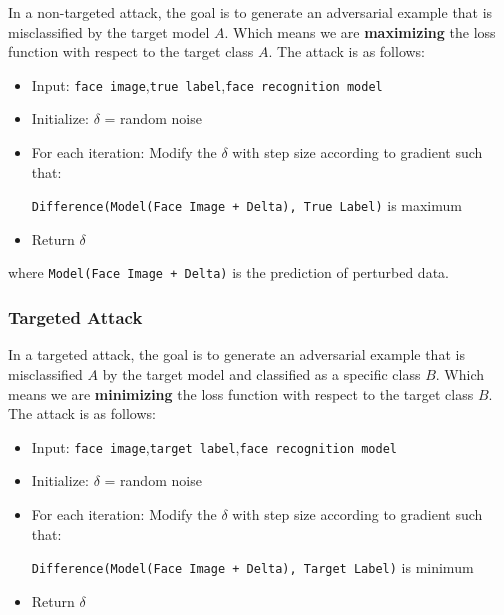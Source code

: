 In a non-targeted attack, the goal is to generate an adversarial example that is misclassified by the target model $A$. Which means we are \textbf{maximizing} the loss function with respect to the target class $A$. The attack is as follows:\\

\begin{itemize}
    \item Input: \verb|face image|,\quad \verb|true label|,\quad \verb|face recognition model|
    \item Initialize: $\delta$ = random noise
    \item For each iteration: Modify the $\delta$ with step size according to gradient such that:\begin{center}
        \verb|Difference(Model(Face Image + Delta), True Label)| is maximum
    \end{center}

    \item Return $\delta$\\
\end{itemize}

where \verb|Model(Face Image + Delta)| is the prediction of perturbed data.

\subsubsection{Targeted Attack}

In a targeted attack, the goal is to generate an adversarial example that is misclassified $A$ by the target model and classified as a specific class $B$. Which means we are \textbf{minimizing} the loss function with respect to the target class $B$. The attack is as follows:\\

\begin{itemize}
    \item Input: \verb|face image|,\quad \verb|target label|,\quad \verb|face recognition model|
    \item Initialize: $\delta$ = random noise
    \item For each iteration: Modify the $\delta$ with step size according to gradient such that:\begin{center}
        \verb|Difference(Model(Face Image + Delta), Target Label)| is minimum
    \end{center}

    \item Return $\delta$\\
\end{itemize}

